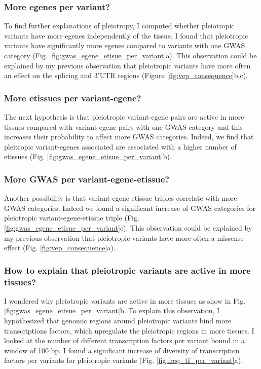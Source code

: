 \subsubsection*{More egenes per variant?}

To find further explanations of pleiotropy, I computed whether pleiotropic variants have more egenes independently of the tissue.
%
I found that pleiotropic variants have significantly more egenes compared to variants with one GWAS category (Fig. \ref{fig:gwas_egene_etisue_per_variant}a).
%
This observation could be explained by my previous observation that pleiotropic variants have more often an effect on the splicing and 3'UTR regions (Figure \ref{fig:vep_consequence}b,c).

\subsubsection*{More etissues per variant-egene?}

The next hypothesis is that pleiotropic variant-egene pairs are active in more tissues compared with variant-egene pairs with one GWAS category and this increases their probability to affect more GWAS categories.
%
Indeed, we find that pleitropic variant-egenes associated are associated with a higher number of etissues (Fig. \ref{fig:gwas_egene_etisue_per_variant}b).

\subsubsection*{More GWAS per variant-egene-etissue?}

Another possibility is that variant-egene-etissue triples correlate with more GWAS categories.
%
Indeed we found a significant increase of GWAS categories for pleiotropic variant-egene-etissue triple (Fig. \ref{fig:gwas_egene_etisue_per_variant}c).
%
This observation could be explained by my previous observation that pleiotropic variants have more often a missense effect (Fig. \ref{fig:vep_consequence}a).

\subsubsection*{How to explain that pleiotropic variants are active in more tissues?}

I wondered why pleiotropic variants are active in more tissues as show in Fig. \ref{fig:gwas_egene_etisue_per_variant}b.
%
To explain this observation, I hypothesized that genomic regions around pleiotropic variants bind more transcriptions factors, which upregulate the pleiotropic regions in more tissues.
%
I looked at the number of different transcription factors per variant bound in a window of 100 bp.
%
I found a significant increase of diversity of transcription factors per variants for pleiotropic variants (Fig. \ref{fig:freq_tf_per_variant}a).

